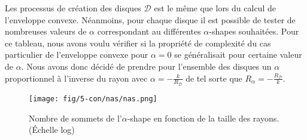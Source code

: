 Les processus de création des disques $\mathcal{D}$ est le même que lors du calcul de l'enveloppe convexe. Néanmoins, pour chaque disque il est possible de tester de nombreuses valeurs de $\alpha$ correspondant au différentes $\alpha$-shapes souhaitées. Pour ce tableau, nous avons voulu vérifier si la propriété de complexité du cas particulier de l'enveloppe convexe pour $\alpha = 0$ se généralisait pour certaine valeur de $\alpha$. Nous avons donc décidé de prendre pour l'ensemble des disques un $\alpha$ proportionnel à l'inverse du rayon avec $\alpha = -\frac{k}{R_{\mathcal{D}}}$ de tel sorte que $R_{\alpha} = -\frac{R_{\mathcal{D}}}{k}$.
 

\begin{figure}[H]
  \centering
  \texttt{[image: fig/5-con/nas/nas.png]}
  \caption{Nombre de sommets de l'$\alpha$-shape en fonction de la taille des rayons. (Échelle log)}
\end{figure}


